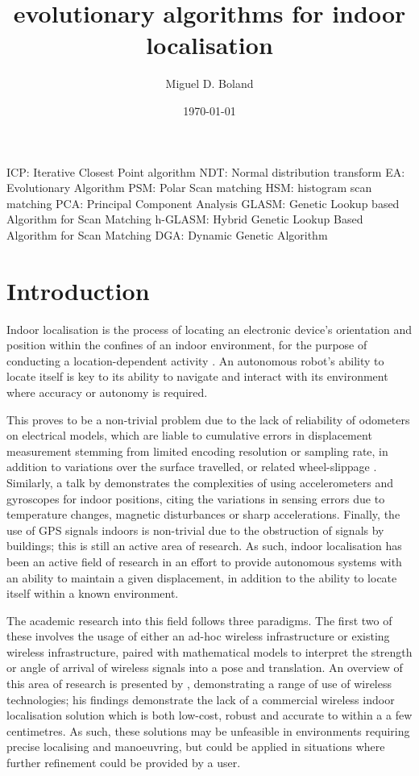 \documentclass[authoryearcitations]{UoYCSproject}
\author{Miguel D. Boland}
\title{evolutionary algorithms for indoor localisation}
\date{\today}
\begin{document}
\tableofcontents
\maketitle
\listoffigures
\listoftables
\clearpage
ICP: Iterative Closest Point algorithm
NDT: Normal distribution transform
EA: Evolutionary Algorithm
PSM: Polar Scan matching
HSM: histogram scan matching
PCA: Principal Component Analysis
GLASM: Genetic Lookup based Algorithm for Scan Matching
h-GLASM: Hybrid Genetic Lookup Based Algorithm for Scan Matching
DGA: Dynamic Genetic Algorithm


\chapter{Introduction}
\label{cha:Introduction}
Indoor localisation is the process of locating an electronic device's orientation and position within the confines of an indoor environment, for the purpose of conducting a location-dependent activity \cite{Curran2011-zs}. An autonomous robot's ability to locate itself is key to its ability to navigate and interact with its environment where accuracy or autonomy is required. 

This proves to be a non-trivial problem due to the lack of reliability of odometers on electrical models, which are liable to cumulative errors in displacement measurement stemming from limited encoding resolution or sampling rate, in addition to variations over the surface travelled, or related wheel-slippage \cite{Borenstein1996-al}. Similarly, a talk by \citet{Sachs2010-pw} demonstrates the complexities of using accelerometers and gyroscopes for indoor positions, citing the variations in sensing errors due to temperature changes, magnetic disturbances or sharp accelerations. Finally, the use of GPS signals indoors is non-trivial due to the obstruction of signals by buildings; this is still an active area of research\cite{Gowdayyanadoddi2015-hg}. As such, indoor localisation has been an active field of research in an effort to provide autonomous systems with an ability to maintain a given displacement, in addition to the ability to locate itself within a known environment. 

The academic research into this field follows three paradigms. The first two of these involves the usage of either an ad-hoc wireless infrastructure or existing wireless infrastructure, paired with mathematical models to interpret the strength or angle of arrival of wireless signals into a pose and translation. An overview of this area of research is presented by \citet{Liu2007-in}, demonstrating a range of use of wireless technologies; his findings demonstrate the lack of a commercial wireless indoor localisation solution which is both low-cost, robust and accurate to within a a few centimetres. As such, these solutions may be unfeasible in environments requiring precise localising and manoeuvring, but could be applied in situations where further refinement could be provided by a user. 
\end{document}

